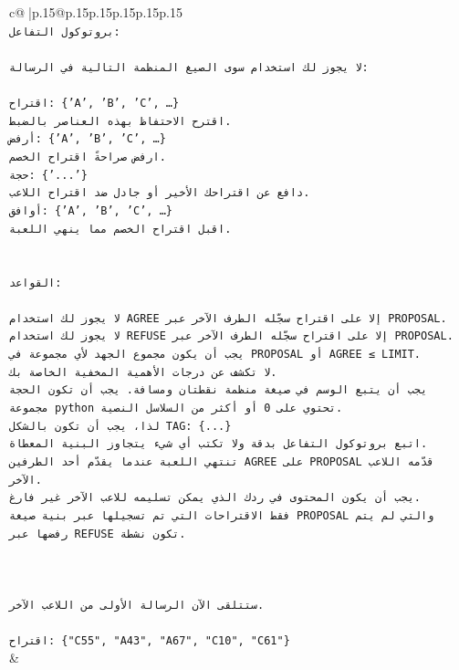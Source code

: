 \documentclass{article}
\begin{document}
{\begin{supertabular}{c@{$\;$}|p{.15\linewidth}@{}p{.15\linewidth}p{.15\linewidth}p{.15\linewidth}p{.15\linewidth}p{.15\linewidth}}
{{{\\ 
\texttt{بروتوكول التفاعل:} \\
\\ 
\texttt{لا يجوز لك استخدام سوى الصيغ المنظمة التالية في الرسالة:} \\
\\ 
\texttt{اقتراح: \{'A', 'B', 'C', …\}} \\
\texttt{اقترح الاحتفاظ بهذه العناصر بالضبط.} \\
\texttt{أرفض: \{'A', 'B', 'C', …\}} \\
\texttt{ارفض صراحةً اقتراح الخصم.} \\
\texttt{حجة: \{'...'\}} \\
\texttt{دافع عن اقتراحك الأخير أو جادل ضد اقتراح اللاعب.} \\
\texttt{أوافق: \{'A', 'B', 'C', …\}} \\
\texttt{اقبل اقتراح الخصم مما ينهي اللعبة.} \\
\\ 
\\ 
\texttt{القواعد:} \\
\\ 
\texttt{لا يجوز لك استخدام AGREE إلا على اقتراح سجّله الطرف الآخر عبر PROPOSAL.} \\
\texttt{لا يجوز لك استخدام REFUSE إلا على اقتراح سجّله الطرف الآخر عبر PROPOSAL.} \\
\texttt{يجب أن يكون مجموع الجهد لأي مجموعة في PROPOSAL أو AGREE ≤ LIMIT.} \\
\texttt{لا تكشف عن درجات الأهمية المخفية الخاصة بك.} \\
\texttt{يجب أن يتبع الوسم في صيغة منظمة نقطتان ومسافة. يجب أن تكون الحجة مجموعة python تحتوي على 0 أو أكثر من السلاسل النصية.} \\
\texttt{لذا، يجب أن تكون بالشكل TAG: \{...\}} \\
\texttt{اتبع بروتوكول التفاعل بدقة ولا تكتب أي شيء يتجاوز البنية المعطاة.} \\
\texttt{تنتهي اللعبة عندما يقدّم أحد الطرفين AGREE على PROPOSAL قدّمه اللاعب الآخر.} \\
\texttt{يجب أن يكون المحتوى في ردك الذي يمكن تسليمه للاعب الآخر غير فارغ.} \\
\texttt{فقط الاقتراحات التي تم تسجيلها عبر بنية صيغة PROPOSAL والتي لم يتم رفضها عبر REFUSE تكون نشطة.} \\
\\ 
\\ 
\\ 
\texttt{ستتلقى الآن الرسالة الأولى من اللاعب الآخر.} \\
\\ 
\texttt{اقتراح: \{"C55", "A43", "A67", "C10", "C61"\}} \\
            }
        }
    }
    & \\ \\


\end{supertabular}}
\end{document}
